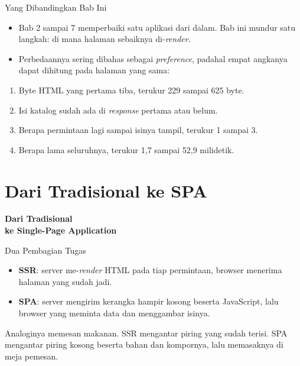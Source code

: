 \documentclass[aspectratio=169, table, 12pt]{beamer}
\begin{document}
\begin{frame}{{\Large Yang Dibandingkan Bab Ini}}
  \vspace{10pt}
  \begin{itemize}
    \item Bab 2 sampai 7 memperbaiki satu aplikasi dari dalam. Bab ini mundur
          satu langkah: di mana halaman sebaiknya di-\textit{render}.
    \item Perbedaannya sering dibahas sebagai \textit{preference}, padahal
          empat angkanya dapat dihitung pada halaman yang sama:
  \end{itemize}
  \vspace{2pt}
  {\small
  \begin{enumerate}
    \item Byte HTML yang pertama tiba, terukur 229 sampai 625 byte.
    \item Isi katalog sudah ada di \textit{response} pertama atau belum.
    \item Berapa permintaan lagi sampai isinya tampil, terukur 1 sampai 3.
    \item Berapa lama seluruhnya, terukur 1,7 sampai 52,9 milidetik.
  \end{enumerate}}
\end{frame}

\section{Dari Tradisional ke SPA}

\begin{frame}{\hfill}
  \centering
  \Huge{\textbf{Dari Tradisional\\ke Single-Page Application}}
\end{frame}

\begin{frame}{{\Large Dua Pembagian Tugas}}
  \vspace{12pt}
  \begin{itemize}
    \item \textbf{SSR}: server me-\textit{render} HTML pada tiap permintaan, browser
          menerima halaman yang sudah jadi.
    \item \textbf{SPA}: server mengirim kerangka hampir kosong beserta
          JavaScript, lalu browser yang meminta data dan menggambar isinya.
  \end{itemize}
  \vspace{8pt}
  {\small Analoginya memesan makanan. SSR mengantar piring yang sudah terisi.
  SPA mengantar piring kosong beserta bahan dan kompornya, lalu memasaknya di
  meja pemesan.}
\end{frame}
\end{document}
